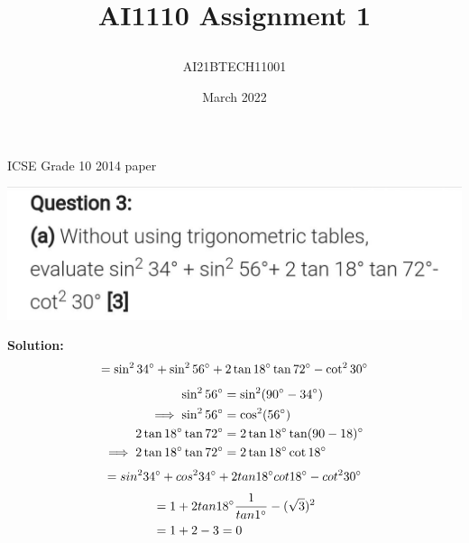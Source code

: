 \documentclass[journal,12pt,twocolumn]{IEEEtran}
\title{\textbf{AI1110 Assignment 1}
\author{AI21BTECH11001 }}
\date{March 2022}
\begin{document}
\maketitle
\begin{center}
{ICSE Grade 10 2014 paper}\end{center}

\includegraphics[scale=0.22]{main.jpeg}

\textbf{Solution:}
\begin{align}
= \sin^2 34\degree+ \sin^2 56\degree+2\tan 18\degree \tan 72\degree - \cot^2 30\degree
\end{align}
\begin{align}
 \sin^2 56\degree &= \sin^2 (90\degree - 34\degree)\\
  \implies \sin^2 56\degree &= \cos^2 (56\degree)\\
  \newline
  2\tan18\degree\tan72\degree &= 2\tan18\degree\tan(90 - 18)\degree\\
  \implies 2\tan18\degree\tan72\degree &= 2\tan18\degree\cot18\degree
 \end{align}
 \begin{align}
= sin^2 34\degree +cos^2 34\degree +2tan18\degree cot18\degree - cot^2 30\degree \end{align}
\begin{align}
&= 1 + 2tan18\degree \frac{1}{tan1\degree} - (\sqrt{3})^2\\
&= 1 + 2 - 3
 = 0\end{align}
\end{document}
